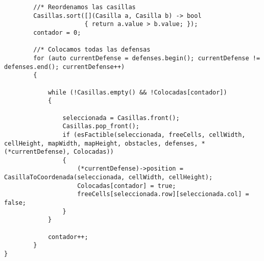 \begin{lstlisting}
        //* Reordenamos las casillas
        Casillas.sort([](Casilla a, Casilla b) -> bool
                      { return a.value > b.value; });
        contador = 0;
    
        //* Colocamos todas las defensas
        for (auto currentDefense = defenses.begin(); currentDefense != defenses.end(); currentDefense++)
        {
    
            while (!Casillas.empty() && !Colocadas[contador])
            {
    
                seleccionada = Casillas.front();
                Casillas.pop_front();
                if (esFactible(seleccionada, freeCells, cellWidth, cellHeight, mapWidth, mapHeight, obstacles, defenses, *(*currentDefense), Colocadas))
                {
                    (*currentDefense)->position = CasillaToCoordenada(seleccionada, cellWidth, cellHeight);
                    Colocadas[contador] = true;
                    freeCells[seleccionada.row][seleccionada.col] = false;
                }
            }
    
            contador++;
        }
}

\end{lstlisting}